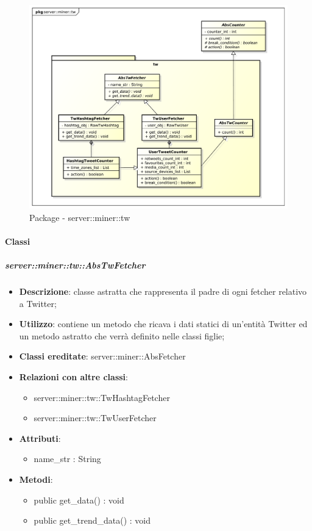 	\begin{figure}[!htbp]
		\centering
		\centerline{\includegraphics[scale=0.4]{./images/server/miner_tw.pdf}}
		\caption{Package - server::miner::tw}
	\end{figure}

	\paragraph{Classi} %
	\subparagraph{server::miner::tw::AbsTwFetcher} %
		\label{subp:server_miner_tw_AbsTwFetcher}
			\begin{itemize}
				\item \textbf{Descrizione}: classe astratta che rappresenta il padre di ogni fetcher relativo a Twitter;
				\item \textbf{Utilizzo}: contiene un metodo che ricava i dati statici di un'entità Twitter ed un metodo astratto che verrà definito nelle classi figlie;
				\item \textbf{Classi ereditate}: server::miner::AbsFetcher
				\item \textbf{Relazioni con altre classi}:
					\begin{itemize}
						\item server::miner::tw::TwHashtagFetcher
						\item server::miner::tw::TwUserFetcher
					\end{itemize}
				\item \textbf{Attributi}:   
					\begin{itemize}
						\item name\_str : String
					\end{itemize}
				\item \textbf{Metodi}:  
					\begin{itemize}
						\item public get\_data() : void
						\item public get\_trend\_data() : void
					\end{itemize}
			\end{itemize}

